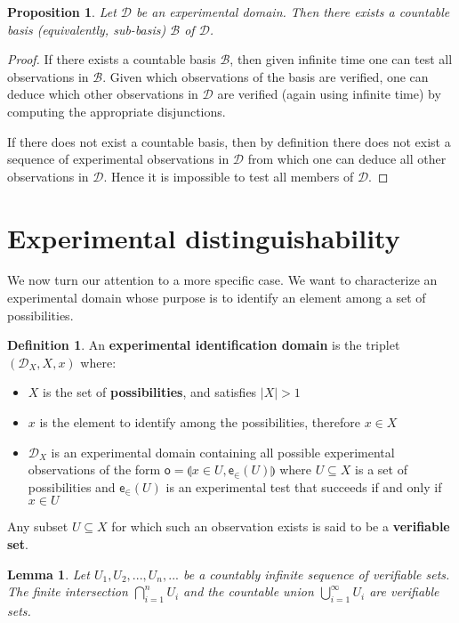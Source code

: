 \documentclass[preprint]{elsarticle}
\theoremstyle{plain}%
\newtheorem{lem}[thm]{Lemma}
\newtheorem{prop}[thm]{Proposition}
\theoremstyle{definition}
\newtheorem{defn}{Definition}[section]
\theoremstyle{remark}
\begin{document}
\begin{prop}
Let $\mathcal{D}$ be an experimental domain. Then there exists a countable basis (equivalently, sub-basis) $\mathcal{B}$ of $\mathcal{D}$.
\end{prop}

\begin{proof}
If there exists a countable basis $\mathcal{B}$, then given infinite time one can test all observations in $\mathcal{B}$. Given which observations of the basis are verified, one can deduce which other observations in $\mathcal{D}$ are verified (again using infinite time) by computing the appropriate disjunctions. 

If there does not exist a countable basis, then by definition there does not exist a sequence of experimental observations in $\mathcal{D}$ from which one can deduce all other observations in $\mathcal{D}$. Hence it is impossible to test all members of $\mathcal{D}$.
\end{proof}

\section{Experimental distinguishability}

We now turn our attention to a more specific case. We want to characterize an experimental domain whose purpose is to identify an element among a set of possibilities.

\begin{defn}
	An \textbf{experimental identification domain} is the triplet $(\mathcal{D}_X, X, x)$ where:
	\begin{itemize}
		\item $X$ is the set of \textbf{possibilities}, and satisfies $|X|>1$
		\item $x$ is the element to identify among the possibilities, therefore $x \in X$
		\item $\mathcal{D}_X$ is an experimental domain containing all possible experimental observations of the form $\mathsf{o} = \llparenthesis x\in U, \mathsf{e}_\in(U)\rrparenthesis$ where $U \subseteq X$ is a set of possibilities and $\mathsf{e}_\in(U)$ is an experimental test that succeeds if and only if $x \in U$
	\end{itemize}
	Any subset $U\subseteq X$ for which such an observation exists is said to be a \textbf{verifiable set}.
\end{defn}

\begin{lem}
\label{setbehavior}
	Let $U_1, U_2, ... , U_n, ...$ be a countably infinite sequence of verifiable sets. The finite intersection $\bigcap\limits_{i=1}^{n} U_i$ and the countable union $\bigcup\limits_{i=1}^{\infty} U_i$ are verifiable sets.
\end{lem}
\end{document}
